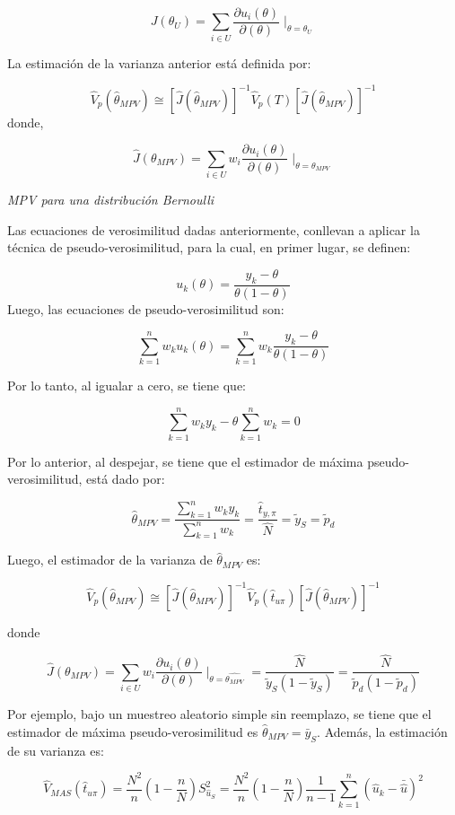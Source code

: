 \documentclass[
  12pt,
]{book}
\begin{document}
\[
J(\theta_{U})=\sum_{i\in U}\dfrac{\partial u_{i}(\theta)}{\partial(\theta)}\mid_{\theta=\theta_{U}}
\]

La estimación de la varianza anterior está definida por:

\[
\hat{V}_{p}(\hat{\theta}_{MPV})\cong[\hat{J}(\hat{\theta}_{MPV})]^{-1}\hat{V}_{p}(T)[\hat{J}(\hat{\theta}_{MPV})]^{-1}
\]
donde,

\[
\hat{J}(\theta_{MPV})=\sum_{i\in U}w_{i}\dfrac{\partial u_{i}(\theta)}{\partial(\theta)}\mid_{\theta=\theta_{MPV}}
\]

\emph{MPV para una distribución Bernoulli}

Las ecuaciones de verosimilitud dadas anteriormente, conllevan a aplicar la técnica de pseudo-verosimilitud, para la cual, en primer lugar, se definen:

\[
u_{k}(\theta)=\frac{y_{k}-\theta}{\theta(1-\theta)}
\]
Luego, las ecuaciones de pseudo-verosimilitud son:

\[
\sum_{k=1}^{n}w_{k}u_{k}(\theta)=\sum_{k=1}^{n}w_{k}\frac{y_{k}-\theta}{\theta(1-\theta)}
\]

Por lo tanto, al igualar a cero, se tiene que:

\[
\sum_{k=1}^{n}w_{k}y_{k}-\theta\sum_{k=1}^{n}w_{k}=0
\]

Por lo anterior, al despejar, se tiene que el estimador de máxima pseudo-verosimilitud, está dado por:

\[
\hat{\theta}_{MPV}=\frac{\sum_{k=1}^{n}w_{k}y_{k}}{\sum_{k=1}^{n}w_{k}}=\frac{\hat{t}_{y,\pi}}{\hat{N}}=\tilde{y}_{S}=\tilde{p}_{d}
\]

Luego, el estimador de la varianza de \(\hat{\theta}_{MPV}\) es:

\[
\hat{V}_{p}(\hat{\theta}_{MPV})\cong[\hat{J}(\hat{\theta}_{MPV})]^{-1}\hat{V}_{p}(\hat{t}_{u\pi})[\hat{J}(\hat{\theta}_{MPV})]^{-1}
\]

donde

\[
\hat{J}(\theta_{MPV})=\sum_{i\in U}w_{i}\dfrac{\partial u_{i}(\theta)}{\partial(\theta)}\mid_{\theta=\hat{\theta_{MPV}}}=\frac{\hat{N}}{\tilde{y}_{S}(1-\tilde{y}_{S})}=\frac{\hat{N}}{\tilde{p}_{d}(1-\tilde{p}_{d})}
\]

Por ejemplo, bajo un muestreo aleatorio simple sin reemplazo, se tiene que el estimador de máxima pseudo-verosimilitud es \(\hat{\theta}_{MPV}=\bar{y}_{S}\). Además, la estimación de su varianza es:

\[
\hat{V}_{MAS}(\hat{t}_{u\pi})=\frac{N^{2}}{n}\left(1-\frac{n}{N}\right)S_{\hat{u}_{S}}^{2}=\frac{N^{2}}{n}\left(1-\frac{n}{N}\right)\frac{1}{n-1}\sum_{k=1}^{n}(\hat{u}_{k}-\bar{\hat{u}})^{2}
\]
\end{document}
